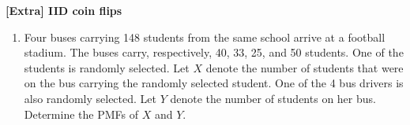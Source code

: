 \documentclass[12pt]{article}%
\newcommand{\0}{{\bf 0}}
\begin{document}
\begin{center}
{\Large\bf [Extra] IID coin flips} 
\end{center}






\begin{enumerate}



\item 
Four buses carrying 148 students from the same school 
arrive at a football stadium. 
The buses carry, respectively, 40, 33, 25, and 50 students. 
One of the students is randomly selected. 
Let $X$ denote the number of students 
that were on the bus carrying the randomly selected student. 
One of the 4 bus drivers is also randomly selected. 
Let $Y$ denote the number of students on her bus.
Determine the PMFs of $X$ and $Y$.






\end{enumerate}
\end{document}
